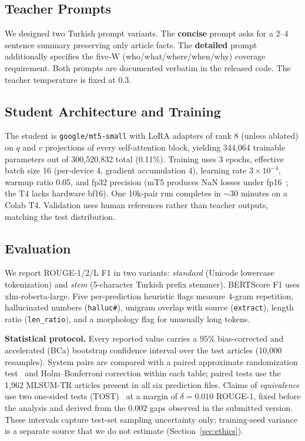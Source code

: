 \documentclass[conference]{IEEEtran}
\begin{document}
\subsection{Teacher Prompts}
We designed two Turkish prompt variants. The \textbf{concise} prompt asks for a 2--4 sentence summary preserving only article facts. The \textbf{detailed} prompt additionally specifies the five-W (who/what/where/when/why) coverage requirement. Both prompts are documented verbatim in the released code. The teacher temperature is fixed at 0.3.

\subsection{Student Architecture and Training}
The student is \texttt{google/mt5-small} with LoRA adapters of rank 8 (unless ablated) on $q$ and $v$ projections of every self-attention block, yielding 344{,}064 trainable parameters out of 300{,}520{,}832 total (0.11\%). Training uses 3 epochs, effective batch size 16 (per-device 4, gradient accumulation 4), learning rate $3 \times 10^{-4}$, warmup ratio 0.05, and fp32 precision (mT5 produces NaN losses under fp16~\cite{xue2021mt5}; the T4 lacks hardware bf16). One 10k-pair run completes in $\sim$30 minutes on a Colab T4. Validation uses human references rather than teacher outputs, matching the test distribution.

\subsection{Evaluation}
We report ROUGE-1/2/L F1 in two variants: \emph{standard} (Unicode lowercase tokenization) and \emph{stem} (5-character Turkish prefix stemmer). BERTScore F1 uses xlm-roberta-large. Five per-prediction heuristic flags measure 4-gram repetition, hallucinated numbers (\texttt{halluc\#}), unigram overlap with source (\texttt{extract}), length ratio (\texttt{len\_ratio}), and a morphology flag for unusually long tokens.

\textbf{Statistical protocol.} Every reported value carries a 95\% bias-corrected and accelerated (BCa) bootstrap confidence interval over the test articles (10{,}000 resamples). System pairs are compared with a paired approximate randomization test~\cite{dror2018hitchhiker} and Holm--Bonferroni correction within each table; paired tests use the 1{,}962 MLSUM-TR articles present in all six prediction files. Claims of \emph{equivalence} use two one-sided tests (TOST)~\cite{lakens2017equivalence} at a margin of $\delta=0.010$ ROUGE-1, fixed before the analysis and derived from the $0.002$ gaps observed in the submitted version. These intervals capture test-set sampling uncertainty only; training-seed variance is a separate source that we do not estimate (Section~\ref{sec:ethics}).
\end{document}
